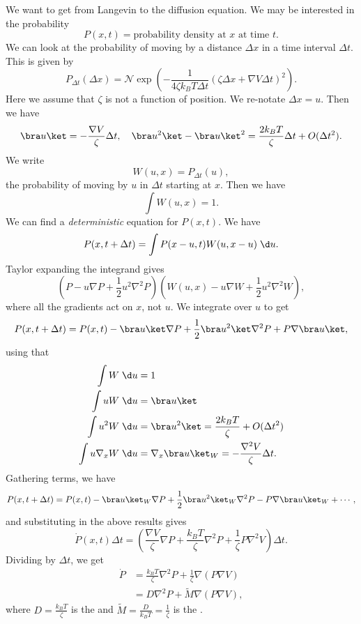 \documentclass[a4paper]{article}
\begin{document}
We want to get from Langevin to the diffusion equation. We may be interested in the probability
\[
  P(x, t) = \text{probability density at $x$ at time $t$}.
\]
We can look at the probability of moving by a distance $\Delta x$ in a time interval $\Delta t$. This is given by
\[
  P_{\Delta t}(\Delta x) = \mathcal{N} \exp \left(-\frac{1}{4 \zeta k_B T \Delta t} (\zeta \Delta x + \nabla V \Delta t)^2\right).
\]
Here we assume that $\zeta$ is not a function of position. We re-notate $\Delta x = u$. Then we have
\[
  \bra u\ket = - \frac{\nabla V}{\zeta} \Delta t,\quad \bra u^2\ket - \bra u\ket^2 = \frac{2k_B T}{\zeta} \Delta t + O(\Delta t^2).
\]
We write
\[
  W(u, x) = P_{\Delta t}(u),
\]
the probability of moving by $u$ in $\Delta t$ starting at $x$. Then we have
\[
  \int W(u, x) = 1.
\]
We can find a \emph{deterministic} equation for $P(x, t)$. We have
\[
  P(x, t + \Delta t) = \int P(x - u, t) W(u, x - u)\;\d u.
\]
Taylor expanding the integrand gives
\[
  \left(P - u \nabla P + \frac{1}{2} u^2 \nabla^2 P\right)\left(W(u, x) - u \nabla W + \frac{1}{2} u^2 \nabla^2 W\right),
\]
where all the gradients act on $x$, not $u$. We integrate over $u$ to get
\[
  P(x, t + \Delta t) = P(x, t) - \bra u \ket \nabla P + \frac{1}{2} \bra u^2\ket \nabla^2 P + P \nabla \bra u\ket,
\]
using that
\begin{align*}
  \int W \;\d u &= 1\\
  \int u W \;\d u&= \bra u\ket\\
  \int u^2 W \;\d u &= \bra u^2\ket = \frac{2k_B T}{\zeta} + O(\Delta t^2)\\
  \int u \nabla_x W\;\d u &= \nabla_x \bra u\ket_W = - \frac{\nabla^2 V}{\zeta}\Delta t.
\end{align*}
Gathering terms, we have
\[
  P(x, t + \Delta t) = P(x, t) - \bra u\ket_W \nabla P + \frac{1}{2} \bra u^2\ket_W \nabla^2 P - P \nabla \bra u\ket_W + \cdots,
\]
and substituting in the above results gives
\[
  \dot{P}(x, t) \Delta t = \left(\frac{\nabla V}{\zeta} \nabla P + \frac{k_B T}{\zeta} \nabla^2 P + \frac{1}{\zeta} P \nabla^2 V \right)\Delta t.
\]
Dividing by $\Delta t$, we get
\begin{align*}
  \dot{P} &= \frac{k_B T}{\zeta} \nabla^2 P + \frac{1}{\zeta} \nabla(P \nabla V)\\
  &= D \nabla^2 P + \tilde{M} \nabla(P \nabla V),
\end{align*}
where $D = \frac{k_B T}{\zeta}$ is the  and $\tilde{M} = \frac{D}{k_B T} = \frac{1}{\zeta}$ is the .
\end{document}
